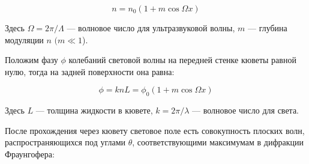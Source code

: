 \documentclass[a4paper,12pt]{article} %
\begin{document}
	\begin{equation}\label{}
	n = n_0 (1 + m \cos \Omega x)
	\end{equation}
	
\noindent Здесь $ \Omega = 2 \pi / \Lambda $ --- волновое число для ультразвуковой волны, $ m $ --- глубина модуляции $ n $ $ (m \ll 1 $).

\medskip
	
\noindent Положим фазу $ \phi $ колебаний световой волны на передней стенке кюветы равной нулю, тогда на задней поверхности она равна:
	
	\begin{equation}\label{}
	\phi  = k n L = \phi_0 (1 + m \cos \Omega x)
	\end{equation}
	
\noindent Здесь $ L $ --- толщина жидкости в кювете, $ k = 2 \pi / \lambda $ --- волновое число для света.

\medskip
	
\noindent После прохождения через кювету световое поле есть совокупность плоских волн, распространяющихся под углами $ \theta $, соответствующими максимумам в дифракции Фраунгофера:
	
\end{document}
